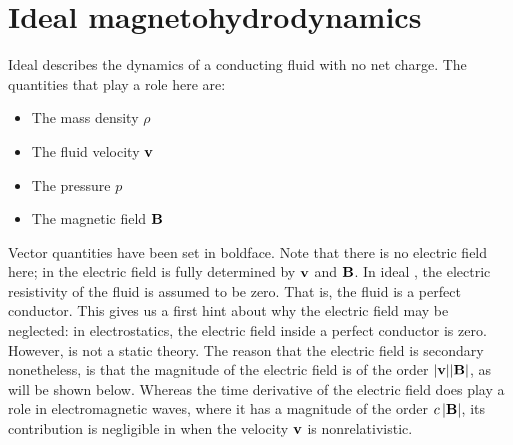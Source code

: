 \section{Ideal magnetohydrodynamics}
\label{sec:ideal-mhd}
Ideal \mhd describes the dynamics of a conducting fluid with no net charge.
The quantities that play a role here are:
\begin{itemize}
\setlength{\itemsep}{-0.5em}
\item The mass density $\rho$
\item The fluid velocity $\mathbf{v}$ \pagebreak
\item The pressure $p$
\item The magnetic field $\mathbf{B}$
\end{itemize}
Vector quantities have been set in boldface.
Note that there is no electric field here;
in \mhd the electric field is fully determined by \kern0.1pt $\mathbf{v}$ and $\mathbf{B}$.
In ideal \mhd, the electric resistivity of the fluid is assumed to be zero.
That is, the fluid is a perfect conductor.
This gives us a first hint about why the electric field may be neglected:
in electrostatics, the electric field inside a perfect conductor is zero.
However, \mhd is not a static theory.
The reason that the electric field is secondary nonetheless,
is that the magnitude of the electric field is of the order $|\mathbf{v}||\mathbf{B}|$,
as will be shown below.
Whereas the time derivative of the electric field does play a role in electromagnetic waves,
where it has a magnitude of the order $c\,|\mathbf{B}|$,
its contribution is negligible in \mhd when the velocity $\mathbf{v}$ is nonrelativistic.

